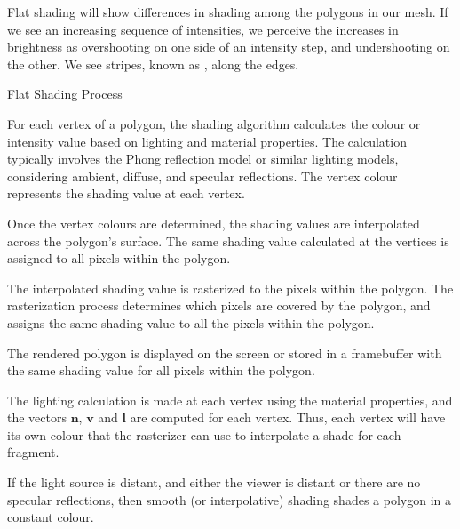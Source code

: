 \documentclass[../COS3712_Notes.tex]{subfiles}
\begin{document}
\begin{descriptimize}
          Flat shading will show differences in shading among the polygons in our mesh.
          If we see an increasing sequence of intensities, we perceive the increases in brightness
          as overshooting on one side of an intensity step, and undershooting on the other.
          We see stripes, known as , along the edges.
          \begin{sidenote}{Flat Shading Process}
            $ $\vspace{-1em}
            \begin{descriptenum}
              \item[Vertex Colour Calculation] For each vertex of a polygon, the shading algorithm
                calculates the colour or intensity value based on lighting and material properties.
                The calculation typically involves the Phong reflection model or similar lighting models,
                considering ambient, diffuse, and specular reflections.
                The vertex colour represents the shading value at each vertex.
              \item[Colour Interpolation] Once the vertex colours are determined,
                the shading values are interpolated across the polygon's surface.
                The same shading value calculated at the vertices is assigned to all pixels
                within the polygon.
              \item[Rasterization] The interpolated shading value is rasterized to the pixels
                within the polygon.
                The rasterization process determines which pixels are covered by the polygon,
                and assigns the same shading value to all the pixels within the polygon.
              \item[Rendering] The rendered polygon is displayed on the screen or stored in a
                framebuffer with the same shading value for all pixels within the polygon.
            \end{descriptenum}
          \end{sidenote}
        \item[Goraud Shading (Smooth Shading)] The lighting calculation is made at each vertex
          using the material properties, and the vectors $\mathbf{n}$, $\mathbf{v}$
          and $\mathbf{l}$ are computed for each vertex.
          Thus, each vertex will have its own colour that the rasterizer can use to interpolate
          a shade for each fragment.

          If the light source is distant, and either the viewer is distant or there are no
          specular reflections, then smooth (or interpolative) shading shades a polygon
          in a constant colour.


\end{descriptimize}
\end{document}
